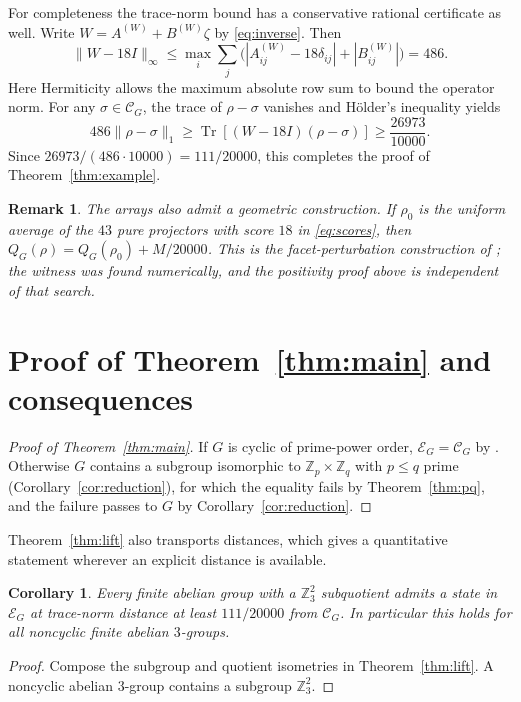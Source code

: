 \documentclass[11pt,a4paper]{article}
\newtheorem{corollary}[theorem]{Corollary}
\theoremstyle{definition}
\theoremstyle{plain}
\newtheorem{remark}[theorem]{Remark}
\newenvironment{statementframe}{%
  \par\addvspace{0.55\baselineskip}\noindent
  \begingroup\setlength{\fboxrule}{0.3pt}\setlength{\fboxsep}{7pt}%
  \begin{lrbox}{\statementbox}%
  \begin{minipage}{\dimexpr\linewidth-2\fboxsep-2\fboxrule\relax}%
}{%
  \end{minipage}\end{lrbox}%
  {\color{black!45}\fbox{\color{black}\usebox{\statementbox}}}%
  \endgroup\par\addvspace{0.45\baselineskip}%
}
\DeclareMathOperator{\Tr}{Tr}
\newcommand{\Z}{\mathbb Z}
\newcommand{\E}{\mathcal E}
\newcommand{\hull}{\mathcal C}
\begin{document}
For completeness the trace-norm bound has a conservative rational
certificate as well. Write $W=A^{(W)}+B^{(W)}\zeta$ by
\eqref{eq:inverse}. Then
\[
 \|W-18I\|_\infty
 \leq\max_i\sum_j
 \bigl(|A^{(W)}_{ij}-18\delta_{ij}|+|B^{(W)}_{ij}|\bigr)=486.
\]
Here Hermiticity allows the maximum absolute row sum to bound the
operator norm. For any $\sigma\in\hull_G$, the trace of $\rho-\sigma$
vanishes and H\"older's inequality yields
\[
 486\|\rho-\sigma\|_1
 \geq\Tr[(W-18I)(\rho-\sigma)]
 \geq\frac{26973}{10000}.
\]
Since $26973/(486\cdot10000)=111/20000$, this completes the proof of
Theorem~\ref{thm:example}.

\begin{remark}
The arrays also admit a geometric construction. If $\rho_0$ is the uniform
average of the $43$ pure projectors with score $18$ in \eqref{eq:scores},
then $Q_G(\rho)=Q_G(\rho_0)+M/20000$. This is the facet-perturbation
construction of \cite[Section~7.2]{DLR}; the witness was found numerically,
and the positivity proof above is independent of that search.
\end{remark}

\section{Proof of Theorem~\ref{thm:main} and consequences}
\begin{proof}[Proof of Theorem~\ref{thm:main}]
If $G$ is cyclic of prime-power order, $\E_G=\hull_G$ by
\cite[Theorem~6.1]{DLR}. Otherwise $G$ contains a subgroup isomorphic to
$\Z_p\times\Z_q$ with $p\leq q$ prime (Corollary~\ref{cor:reduction}), for
which the equality fails by Theorem~\ref{thm:pq}, and the failure passes to
$G$ by Corollary~\ref{cor:reduction}.
\end{proof}

Theorem~\ref{thm:lift} also transports distances, which gives a quantitative
statement wherever an explicit distance is available.

\begin{statementframe}
\begin{corollary}
Every finite abelian group with a $\Z_3^2$ subquotient admits a state in
$\E_G$ at trace-norm distance at least $111/20000$ from $\hull_G$.
In particular this holds for all noncyclic finite abelian $3$-groups.
\end{corollary}
\end{statementframe}
\begin{proof}
Compose the subgroup and quotient isometries in Theorem~\ref{thm:lift}.
A noncyclic abelian $3$-group contains a subgroup $\Z_3^2$.
\end{proof}
\end{document}
